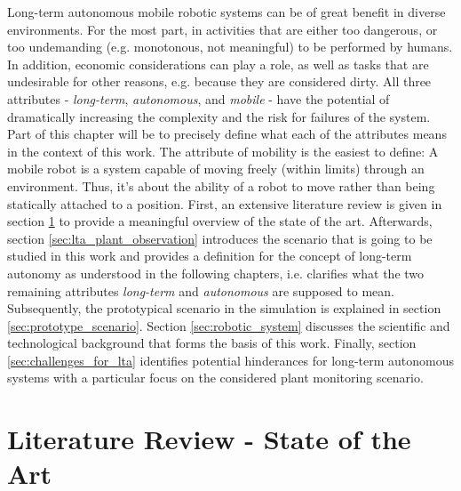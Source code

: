 \documentclass[english, master, utf8]{base/thesis_KBS}
\begin{document}
Long-term autonomous mobile robotic systems can be of great benefit in diverse environments. For the most part, in activities that are either too dangerous,
or too undemanding (e.g. monotonous, not meaningful) to be performed by humans. In addition, economic considerations can play a role, as well as tasks 
that are undesirable for other reasons, e.g. because they are considered dirty.
All three attributes - \textit{long-term}, \textit{autonomous}, and \textit{mobile} - have the potential of dramatically increasing the complexity and
the risk for failures of the system. Part of this chapter will be to precisely define what each of the attributes means in the context of this work.
The attribute of mobility is the easiest to define: A mobile robot is a system capable of moving freely (within limits) through an environment. \cite{Hertzberg:2012}
Thus, it's about the ability of a robot to move rather than being statically attached to a position.\newline
First, an extensive literature review is given in section \ref{sec:literature_review} to provide a meaningful overview of the state of the art.
Afterwards, section \ref{sec:lta_plant_observation} introduces the scenario that is going to be studied in this work and provides a definition for the concept of long-term
autonomy as understood in the following chapters, i.e. clarifies what the two remaining attributes \textit{long-term} and \textit{autonomous} are supposed to mean.
Subsequently, the prototypical scenario in the simulation is explained in section \ref{sec:prototype_scenario}. Section \ref{sec:robotic_system} discusses the scientific and
technological background that forms the basis of this work. Finally, section \ref{sec:challenges_for_lta} identifies potential hinderances for long-term autonomous systems with
a particular focus on the considered plant monitoring scenario.

\section{Literature Review - State of the Art}
\label{sec:literature_review}
\end{document}
